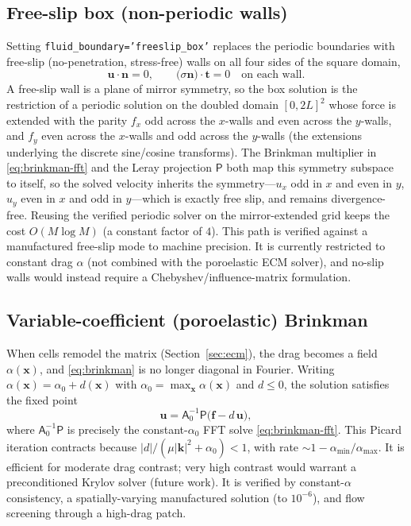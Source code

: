 \documentclass[11pt]{article}
\newcommand{\vu}{\bm{u}}
\newcommand{\vf}{\bm{f}}
\newcommand{\vx}{\bm{x}}
\newcommand{\vk}{\bm{k}}
\begin{document}
\subsection{Free-slip box (non-periodic walls)}\label{sec:freeslip}
Setting \texttt{fluid\_boundary='freeslip\_box'} replaces the periodic boundaries
with free-slip (no-penetration, stress-free) walls on all four sides of the
square domain,
\begin{equation}
  \vu\cdot\bm{n} = 0, \qquad
  \big(\mathsf{\sigma}\bm{n}\big)\cdot\bm{t} = 0
  \quad\text{on each wall.}
\end{equation}
A free-slip wall is a plane of mirror symmetry, so the box solution is the
restriction of a periodic solution on the doubled domain $[0,2L]^2$ whose force
is extended with the parity $f_x$ odd across the $x$-walls and even across the
$y$-walls, and $f_y$ even across the $x$-walls and odd across the $y$-walls (the
extensions underlying the discrete sine/cosine transforms). The Brinkman
multiplier in \eqref{eq:brinkman-fft} and the Leray projection $\mathsf{P}$ both
map this symmetry subspace to itself, so the solved velocity inherits the
symmetry---$u_x$ odd in $x$ and even in $y$, $u_y$ even in $x$ and odd in
$y$---which is exactly free slip, and remains divergence-free. Reusing the
verified periodic solver on the mirror-extended grid keeps the cost
$O(M\log M)$ (a constant factor of $4$). This path is verified against a
manufactured free-slip mode to machine precision. It is currently restricted to
constant drag $\alpha$ (not combined with the poroelastic ECM solver), and no-slip
walls would instead require a Chebyshev/influence-matrix formulation.

\subsection{Variable-coefficient (poroelastic) Brinkman}
When cells remodel the matrix (Section~\ref{sec:ecm}), the drag becomes a field
$\alpha(\vx)$, and \eqref{eq:brinkman} is no longer diagonal in Fourier. Writing
$\alpha(\vx) = \alpha_0 + d(\vx)$ with $\alpha_0 = \max_{\vx} \alpha(\vx)$ and
$d \le 0$, the solution satisfies the fixed point
\begin{equation}
  \vu = \mathsf{A}_0^{-1}\mathsf{P}\big(\vf - d\,\vu\big),
\end{equation}
where $\mathsf{A}_0^{-1}\mathsf{P}$ is precisely the constant-$\alpha_0$ FFT
solve \eqref{eq:brinkman-fft}. This Picard iteration contracts because
$\lvert d\rvert/(\mu\lvert\vk\rvert^2+\alpha_0) < 1$, with rate
$\sim 1 - \alpha_{\min}/\alpha_{\max}$. It is efficient for moderate drag
contrast; very high contrast would warrant a preconditioned Krylov solver
(future work). It is verified by constant-$\alpha$ consistency, a
spatially-varying manufactured solution (to $10^{-6}$), and flow screening
through a high-drag patch.
\end{document}
